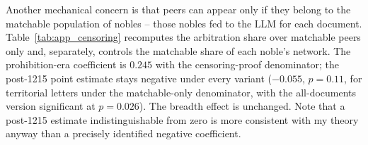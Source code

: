 \documentclass[12pt]{article}
\theoremstyle{definition}
\theoremstyle{remark}
\begin{document}


Another mechanical concern is that peers can appear only if they belong to the matchable population of nobles -- those nobles fed to the LLM for each document. Table~\ref{tab:app_censoring} recomputes the arbitration share over matchable peers only and, separately, controls the matchable share of each noble's network. The prohibition-era coefficient is $0.245$ with the censoring-proof denominator; the post-1215 point estimate stays negative under every variant ($-0.055$, $p=0.11$, for territorial letters under the matchable-only denominator, with the all-documents version significant at $p=0.026$). The breadth effect is unchanged. Note that a post-1215 estimate indistinguishable from zero is more consistent with my theory anyway than a precisely identified negative coefficient.
\end{document}
